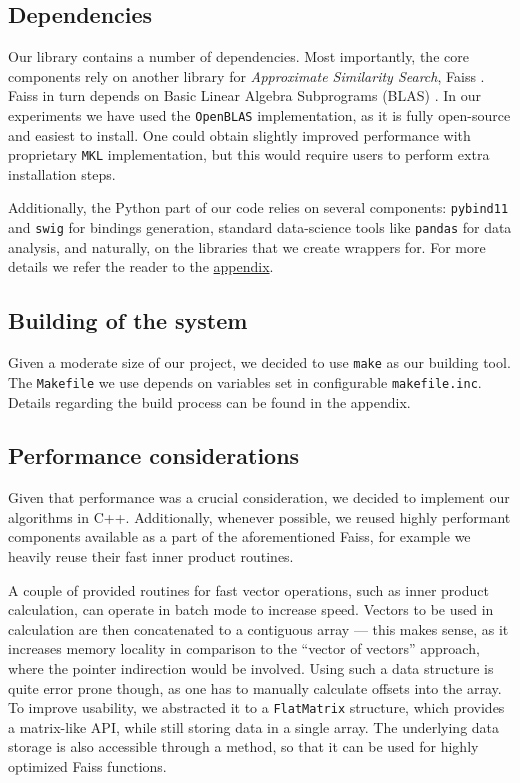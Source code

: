 
\subsection{Dependencies}

Our library contains a number of dependencies. Most importantly, the core components rely on 
another library for \textit{Approximate Similarity Search}, Faiss \cite{faiss}.
Faiss in turn depends on Basic Linear Algebra Subprograms (BLAS) . In our experiments we have used
the \texttt{OpenBLAS} \cite{openblas} implementation, as it is fully open-source and easiest  to install. One
could obtain slightly improved performance with proprietary \texttt{MKL} \cite{mkl} implementation, but this would require
users to perform extra installation steps.

Additionally, the Python part of our code relies on several components: \texttt{pybind11} and \texttt{swig}
for bindings generation, standard data-science tools like \texttt{pandas} for data analysis, and naturally, on the
libraries that we create wrappers for. For more details we refer the reader to the \hyperref[sec:appendices]{appendix}.

\subsection{Building of the system}

Given a moderate size of our project, we decided to use \texttt{make} as our building tool. The \texttt{Makefile} we use
depends on variables set in configurable \texttt{makefile.inc}. Details regarding the build process can be found in the appendix.

\subsection{Performance considerations}

Given that performance was a crucial consideration, we decided to implement our algorithms in C++.
Additionally, whenever possible, we reused highly performant components available as a part of the aforementioned Faiss,
for example we heavily reuse their fast inner product routines. 

A couple of provided routines for fast vector operations, such as inner product calculation, can
operate in batch mode to increase speed. Vectors to be used in calculation are then concatenated
to a contiguous array --- this makes sense, as it increases memory locality in comparison
to the ``vector of vectors'' approach, where the pointer indirection would be involved. Using such a data structure
is quite error prone though, as one has to manually calculate offsets into the array. To improve
usability, we abstracted it to a \texttt{FlatMatrix} structure, which provides a matrix-like API, while
still storing data in a single array. The underlying data storage is also accessible through a method,
so that it can be used for highly optimized Faiss functions.

